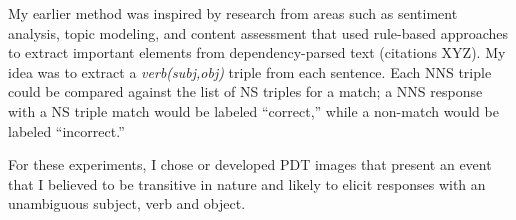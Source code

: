 My earlier method was inspired by research from areas such as sentiment analysis, topic modeling, and content assessment that used rule-based approaches to extract important elements from dependency-parsed text (citations XYZ). My idea was to extract a \textit{verb(subj,obj)} triple from each sentence. Each NNS triple could be compared against the list of NS triples for a match; a NNS response with a NS triple match would be labeled ``correct,'' while a non-match would be labeled ``incorrect.''

For these experiments, I chose or developed PDT images that present an event that I believed to be transitive in nature and likely to elicit responses with an unambiguous subject, verb and object.


